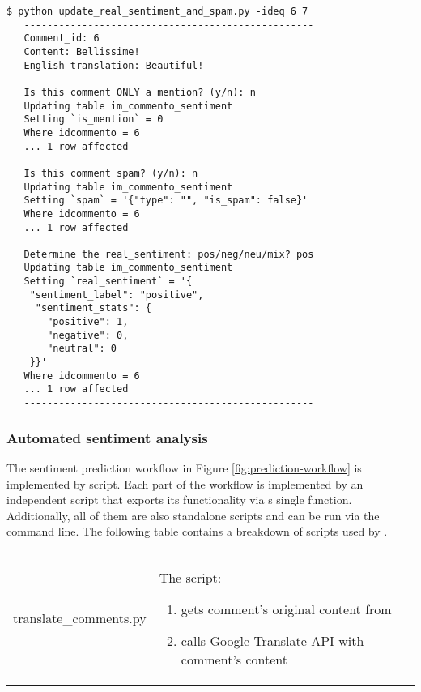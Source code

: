 \begin{Verbatim}[formatcom=\color{darkgray},fontfamily=courier]
 $ python update_real_sentiment_and_spam.py -ideq 6 7
   --------------------------------------------------
   Comment_id: 6
   Content: Bellissime!
   English translation: Beautiful!
   - - - - - - - - - - - - - - - - - - - - - - - - - 
   Is this comment ONLY a mention? (y/n): n
   Updating table im_commento_sentiment
   Setting `is_mention` = 0
   Where idcommento = 6 
   ... 1 row affected
   - - - - - - - - - - - - - - - - - - - - - - - - - 
   Is this comment spam? (y/n): n
   Updating table im_commento_sentiment
   Setting `spam` = '{"type": "", "is_spam": false}' 
   Where idcommento = 6 
   ... 1 row affected
   - - - - - - - - - - - - - - - - - - - - - - - - - 
   Determine the real_sentiment: pos/neg/neu/mix? pos
   Updating table im_commento_sentiment
   Setting `real_sentiment` = '{
    "sentiment_label": "positive",
     "sentiment_stats": {
       "positive": 1, 
       "negative": 0,
       "neutral": 0
    }}'
   Where idcommento = 6 
   ... 1 row affected
   --------------------------------------------------
\end{Verbatim}


\subsubsection*{Automated sentiment analysis}
The sentiment prediction workflow in Figure \ref{fig:prediction-workflow} is implemented by \emph{} script. 
Each part of the workflow is implemented by an independent script that exports its functionality via s single function. 
Additionally, all of them are also standalone scripts and can be run via the command line.
The following table contains a breakdown of scripts used by \emph{}.
\begin{table}[H]
\centering
\doublespacing
\begin{tabularx}{\textwidth}{ m{2.5cm} | X }
	\hline
 	translate\_comments.py & The script:
 			\begin{enumerate}
			\singlespacing
			  \item gets comment's original content from \inlinecode{im\_commento}
			  \item calls Google Translate API with comment's content 
		\end{enumerate} 
\end{tabularx}
\end{table}

